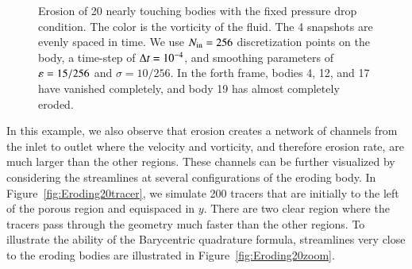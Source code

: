 \documentclass[preprint, 10pt]{elsarticle}
\begin{document}
\begin{figure}[H]
\begin{center}
\caption{\label{fig:Eroding20vort} Erosion of 20 nearly touching bodies
  with the fixed pressure drop condition. The color is the vorticity of
  the fluid. The 4 snapshots are evenly spaced in time. We use $N_{\mathrm{in}} =
  256$ discretization points on the body, a time-step of $\Delta t=10^{-4}$,
  and smoothing parameters of $\varepsilon= 15/256$ and $\sigma=10/256 $. In
  the forth frame, bodies 4, 12, and 17 have vanished completely, and
  body 19 has almost completely eroded.}
\end{center}
\end{figure}

In this example, we also observe that erosion creates a network of
channels from the inlet to outlet where the velocity and vorticity, and
therefore erosion rate, are much larger than the other regions.  These
channels can be further visualized by considering the streamlines at
several configurations of the eroding body.  In
Figure~\ref{fig:Eroding20tracer}, we simulate 200 tracers that are
initially to the left of the porous region and equispaced in $y$.  There
are two clear region where the tracers pass through the geometry
much faster than the other regions.  To illustrate the ability of the
Barycentric quadrature formula, streamlines very close to the eroding
bodies are illustrated in Figure~\ref{fig:Eroding20zoom}. 
\end{document}
